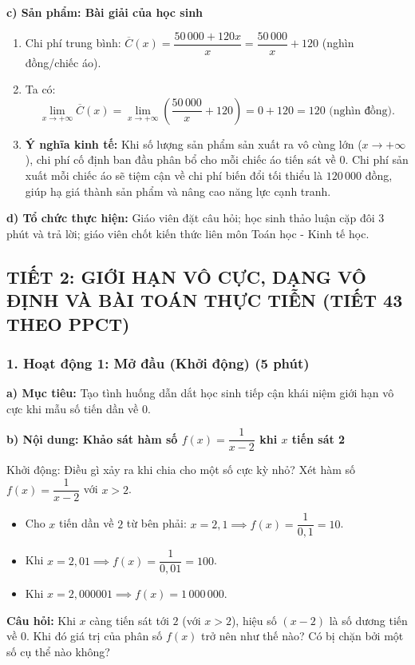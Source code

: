 \documentclass[12pt, a4paper]{article}
\begin{document}
\noindent \textbf{c) Sản phẩm: Bài giải của học sinh}
\begin{enumerate}[leftmargin=0.6cm]
    \item Chi phí trung bình: $\overline{C}(x) = \dfrac{50\,000 + 120x}{x} = \dfrac{50\,000}{x} + 120$ (nghìn đồng/chiếc áo).
    \item Ta có:
    $$\lim_{x \to +\infty} \overline{C}(x) = \lim_{x \to +\infty} \left(\dfrac{50\,000}{x} + 120\right) = 0 + 120 = 120 \text{ (nghìn đồng)}.$$
    \item \textbf{Ý nghĩa kinh tế:} Khi số lượng sản phẩm sản xuất ra vô cùng lớn ($x \to +\infty$), chi phí cố định ban đầu phân bổ cho mỗi chiếc áo tiến sát về 0. Chi phí sản xuất mỗi chiếc áo sẽ tiệm cận về chi phí biến đổi tối thiểu là $120\,000$ đồng, giúp hạ giá thành sản phẩm và nâng cao năng lực cạnh tranh.
\end{enumerate}

\noindent \textbf{d) Tổ chức thực hiện:}
Giáo viên đặt câu hỏi; học sinh thảo luận cặp đôi 3 phút và trả lời; giáo viên chốt kiến thức liên môn Toán học - Kinh tế học.

\newpage

\subsection*{TIẾT 2: GIỚI HẠN VÔ CỰC, DẠNG VÔ ĐỊNH VÀ BÀI TOÁN THỰC TIỄN (TIẾT 43 THEO PPCT)}

\subsubsection*{1. Hoạt động 1: Mở đầu (Khởi động) (5 phút)}

\noindent \textbf{a) Mục tiêu:}
Tạo tình huống dẫn dắt học sinh tiếp cận khái niệm giới hạn vô cực khi mẫu số tiến dần về 0.

\noindent \textbf{b) Nội dung: Khảo sát hàm số $f(x) = \dfrac{1}{x - 2}$ khi $x$ tiến sát 2}
\begin{pedabox}{Khởi động: Điều gì xảy ra khi chia cho một số cực kỳ nhỏ?}
Xét hàm số $f(x) = \dfrac{1}{x - 2}$ với $x > 2$.
\begin{itemize}[leftmargin=0.6cm]
    \item Cho $x$ tiến dần về $2$ từ bên phải: $x = 2{,}1 \implies f(x) = \dfrac{1}{0{,}1} = 10$.
    \item Khi $x = 2{,}01 \implies f(x) = \dfrac{1}{0{,}01} = 100$.
    \item Khi $x = 2{,}000001 \implies f(x) = 1\,000\,000$.
\end{itemize}
\textbf{Câu hỏi:} Khi $x$ càng tiến sát tới $2$ (với $x > 2$), hiệu số $(x - 2)$ là số dương tiến về $0$. Khi đó giá trị của phân số $f(x)$ trở nên như thế nào? Có bị chặn bởi một số cụ thể nào không?
\end{pedabox}
\end{document}
